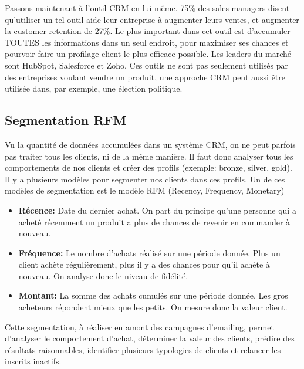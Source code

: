 Passons maintenant à l'outil CRM en lui même. 75\% des sales managers disent qu'utiliser un tel outil aide leur entreprise à augmenter leurs ventes, et augmenter la customer retention de 27\%. Le plus important dans cet outil est d'accumuler TOUTES les informations dans un seul endroit, pour maximiser ses chances et pourvoir faire un profilage client le plus efficace possible. Les leaders du marché sont HubSpot, Salesforce et Zoho. Ces outils ne sont pas seulement utilisés par des entreprises voulant vendre un produit, une approche CRM peut aussi être utilisée dans, par exemple, une élection politique.

\subsection{Segmentation RFM}

Vu la quantité de données accumulées dans un système CRM, on ne peut parfois pas traiter tous les clients, ni de la même manière. Il faut donc analyser tous les comportements de nos clients et créer des profils (exemple: bronze, silver, gold).\\

Il y a plusieurs modèles pour segmenter nos clients dans ces profils. Un de ces modèles de segmentation est le modèle RFM (Recency, Frequency, Monetary)

\begin{itemize}
    \item \textbf{Récence:} Date du dernier achat. On part du principe qu'une personne qui a acheté récemment un produit a plus de chances de revenir en commander à nouveau.
    \item \textbf{Fréquence:} Le nombre d'achats réalisé sur une période donnée. Plus un client achète régulièrement, plus il y a des chances pour qu'il achète à nouveau. On analyse donc le niveau de fidélité.
    \item \textbf{Montant:} La somme des achats cumulés sur une période donnée. Les gros acheteurs répondent mieux que les petits. On mesure donc la valeur client.\\
\end{itemize}

Cette segmentation, à réaliser en amont des campagnes d'emailing, permet d'analyser le comportement d'achat, déterminer la valeur des clients, prédire des résultats raisonnables, identifier plusieurs typologies de clients et relancer les inscrits inactifs.\\

